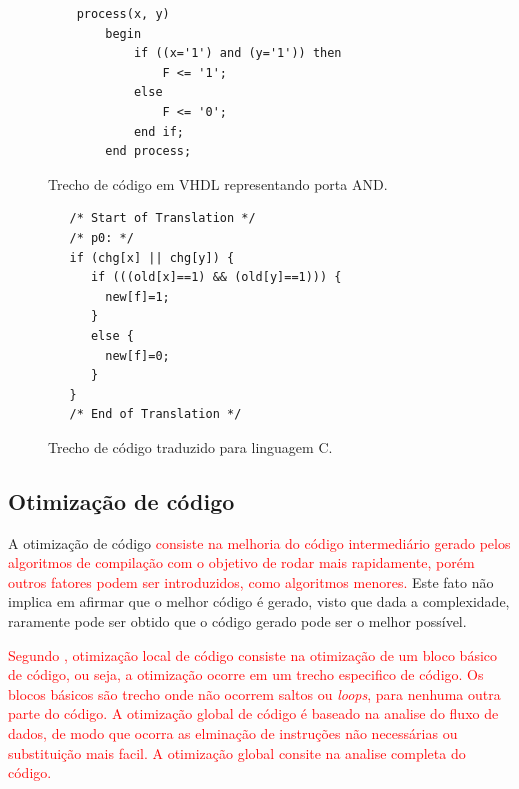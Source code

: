 \begin{figure}[thp]
\caption{\label{fig:cod_vhdl} Trecho de código em VHDL representando porta AND.}
	\begin{center}
    \begin{minipage}{0.9\textwidth}
    \begin{lstlisting}       
	process(x, y)
    	begin
        	if ((x='1') and (y='1')) then
            	F <= '1';
        	else
            	F <= '0';
        	end if;
    	end process;
\end{lstlisting}
    \end{minipage}
	\end{center}
\end{figure}

\begin{figure}[thp]
\caption{\label{fig:cod_c} Trecho de código traduzido para linguagem C.}
	\begin{center}
    \begin{minipage}{0.9\textwidth}
    \begin{lstlisting}       
   /* Start of Translation */
   /* p0: */
   if (chg[x] || chg[y]) {
      if (((old[x]==1) && (old[y]==1))) {
      	new[f]=1;
      }
      else {
      	new[f]=0;
      }
   }
   /* End of Translation */

	\end{lstlisting}
    \end{minipage}
	\end{center}
\end{figure}
\subsection{Otimização de código}
\par
A otimização de código \textcolor{red}{consiste na melhoria do código intermediário gerado pelos algoritmos de compilação com o objetivo de rodar mais rapidamente, porém outros fatores podem ser introduzidos, como algoritmos menores.} Este fato não implica em afirmar que o melhor código é gerado, visto que dada a complexidade, raramente pode ser obtido que o código gerado pode ser o melhor possível\cite{aho2007compilers}.

\par
\textcolor{red}{Segundo \cite{aho2007compilers}, otimização local de código consiste na otimização de um bloco básico de código, ou seja, a otimização ocorre em um trecho especifico de código. Os blocos básicos são trecho onde não ocorrem saltos ou \textit{loops}, para nenhuma outra parte do código. A otimização global de código é baseado na analise do fluxo de dados, de modo que ocorra as elminação de instruções não necessárias ou substituição mais facil. A otimização global consite na analise completa do código.}

